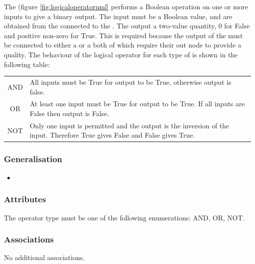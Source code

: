  The  (figure \ref{fig:logicaloperatoruml} performs a Boolean operation on one or
more inputs to give a binary output. The input must be a Boolean
value, and are obtained from the  connected to the
. The output a two-value quantity,  0 for False and positive
non-zero for True. This is required because the output of the
 must be connected to either a
 or a  both of which
require their out node to provide a quality. The behaviour of the
logical operator for each type of  is shown in
the following table:

\begin{tabular}[t]{c p{12cm}}
\toprule
AND & All inputs must be True for output to be True, otherwise output
is false.\\
OR & At least one input must be True for output to be True. If all
inputs are False then output is False.\\
NOT & Only one input is permitted and the output is the inversion of
the input. Therefore True gives False and False gives True.\\
\bottomrule
\end{tabular}

\subsubsection{Generalisation}

\begin{itemize}
\item {}
\end{itemize}

\subsubsection{Attributes}

\begin{attributes}
   The operator type must be one of the
  following enumerations: AND, OR, NOT.
\end{attributes}

\subsubsection{Associations}

No additional associations.

